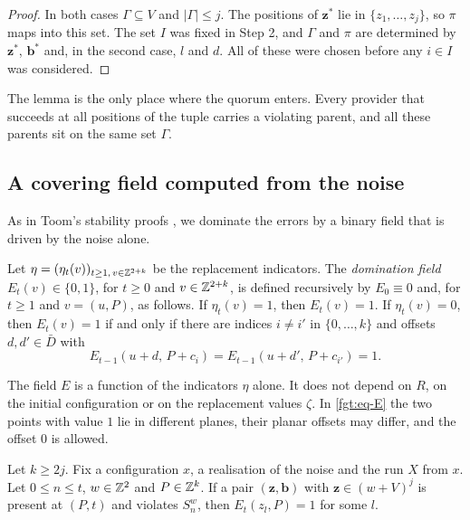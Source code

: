 \begin{proof}
In both cases $\Gamma\subseteq V$ and $|\Gamma|\le j$. The positions of $\mathbf z^*$ lie in $\{z_1,\dots,z_j\}$, so $\pi$ maps into this set. The set $I$ was fixed in Step 2, and $\Gamma$ and $\pi$ are determined by $\mathbf z^*$, $\mathbf b^*$ and, in the second case, $l$ and $d$. All of these were chosen before any $i\in I$ was considered.
\end{proof}

The lemma is the only place where the quorum enters. Every provider that succeeds at all positions of the tuple carries a violating parent, and all these parents sit on the same set $\Gamma$.

\subsection{A covering field computed from the noise}\label{fgt:sec-field}

As in Toom's stability proofs \cite{Toom80,Gacs21}, we dominate the errors by a binary field that is driven by the noise alone.

\begin{definition}\label{def:domination}
Let $\eta=(\eta_t(v))_{t\ge1,\,v\in\mathbb{Z}^{2+k}}$ be the replacement indicators. The \emph{domination field} $E_t(v)\in\{0,1\}$, for $t\ge0$ and $v\in\mathbb{Z}^{2+k}$, is defined recursively by $E_0\equiv0$ and, for $t\ge1$ and $v=(u,P)$, as follows. If $\eta_t(v)=1$, then $E_t(v)=1$. If $\eta_t(v)=0$, then $E_t(v)=1$ if and only if there are indices $i\ne i'$ in $\{0,\dots,k\}$ and offsets $d,d'\in\bar D$ with
\begin{equation}\label{fgt:eq-E}
E_{t-1}(u+d,\,P+c_i)=E_{t-1}(u+d',\,P+c_{i'})=1.
\end{equation}
\end{definition}

The field $E$ is a function of the indicators $\eta$ alone. It does not depend on $R$, on the initial configuration or on the replacement values $\zeta$. In \eqref{fgt:eq-E} the two points with value $1$ lie in different planes, their planar offsets may differ, and the offset $0$ is allowed.

\begin{lemma}[cover]\label{fgt:cover}
Let $k\ge2j$. Fix a configuration $x$, a realisation of the noise and the run $X$ from $x$. Let $0\le n\le t$, $w\in\mathbb{Z}^2$ and $P\in\mathbb{Z}^k$. If a pair $(\mathbf z,\mathbf b)$ with $\mathbf z\in(w+V)^j$ is present at $(P,t)$ and violates $S^w_n$, then $E_t(z_l,P)=1$ for some $l$.
\end{lemma}

